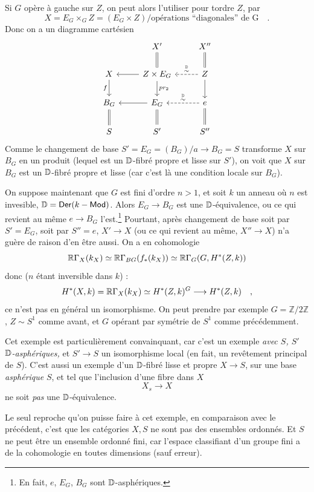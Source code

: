
Si $G$ opère à gauche sur $Z$, on peut alors l'utiliser pour tordre $Z$, par
\[ X = E_G \times_G Z = (E_G \times Z)/\text{opérations ``diagonales'' de G} \quad . \]
Donc on a un diagramme cartésien
\[
\begin{tikzcd}
 & X' \arrow[d, equal] & X'' \arrow[d, equal] \\
X \arrow[d, "f"'] & Z \times E_G \arrow[l] \arrow[d, "pr_2"] & Z \arrow[l, dashed, "{\overset{\D}{\sim}}"'] \arrow[d] \\
B_G \arrow[d, equal] & E_G \arrow[l] \arrow[d, equal] & e \arrow[l, dashed, "{\overset{\D}{\sim}}"'] \arrow[d, equal] \\
S & S' & S''
\end{tikzcd}
\]
Comme le changement de base $S' = E_G = (B_G)/a \to B_G = S$ transforme $X$ sur $B_G$ en un produit (lequel est un $\mathbb{D}$-fibré propre et lisse sur $S'$), on voit que $X$ sur $B_G$ est un $\mathbb{D}$-fibré propre et lisse (car c'est là une condition locale sur $B_G$).

On suppose maintenant que $G$ est fini d'ordre $n > 1$, et soit $k$ un anneau où $n$ est invesible, $\mathbb{D} = \mathsf{Der}(k - \mathsf{Mod})$. Alors $E_G \to B_G$ est une $\mathbb{D}$-équivalence, ou ce qui revient au même $e \to B_G$ l'est.\footnote[47]{En fait, $e$, $E_G$, $B_G$ sont $\mathbb{D}$-asphériques.} Pourtant, après changement de base soit par $S' = E_G$, soit par $S'' = e$, $X' \to X$ (ou ce qui revient au même, $X'' \to X$) n'a guère de raison d'en être aussi. On a en cohomologie %
\[ \mathbb{R}\Gamma_X(k_X) \simeq \mathbb{R}\Gamma_{BG}(f_*(k_X)) \simeq \mathbb{R}\Gamma_G(G, H^*(Z,k)) \]
donc ($n$ étant inversible dans $k$) :
\[ H^*(X,k) = \mathbb{R}\Gamma_X(k_X) \simeq H^*(Z,k)^G \longrightarrow H^*(Z,k) \quad , \]
ce n'est pas en général un isomorphisme. On peut prendre par exemple $G = \mathbb{Z}/2\mathbb{Z}$, $Z \sim S^1$ comme avant, et $G$ opérant par symétrie de $S^1$ comme précédemment.

Cet exemple est particulièrement convainquant, car c'est un exemple \textit{avec $S$, $S'$ $\mathbb{D}$-asphériques,} et $S' \to S$ un isomorphisme local (en fait, un revêtement principal de $S$). C'est aussi un exemple d'un $\mathbb{D}$-fibré lisse et propre $X \to S$, sur une base \textit{asphérique} $S$, et tel que l'inclusion d'une fibre dans $X$ %
\[ X_s \longrightarrow X \]
ne soit \textit{pas} une $\mathbb{D}$-équivalence.

Le seul reproche qu'on puisse faire à cet exemple, en comparaison avec le précédent, c'est que les catégories $X, S$ ne sont pas des ensembles ordonnés. Et $S$ ne peut être un ensemble ordonné fini, car l'espace classifiant d'un groupe fini a de la cohomologie en toutes dimensions (sauf erreur).

